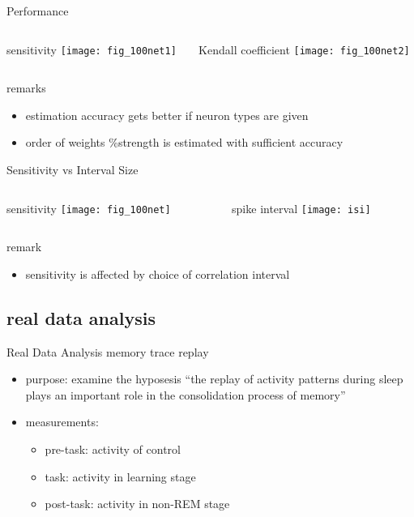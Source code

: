 \documentclass[fleqn,aspectratio=1610]{beamer}
\begin{document}
\begin{frame}[label={sec:orgc3068b3}]{Performance}
\begin{columns}
\begin{column}{0.5\columnwidth}
\centering
sensitivity
\texttt{[image: fig\_100net1]}
\end{column}
\begin{column}{0.5\columnwidth}
\centering
Kendall coefficient
\texttt{[image: fig\_100net2]}
\end{column}
\end{columns}
\begin{alertblock}{remarks}
\begin{itemize}
\item estimation accuracy gets better if neuron types are given
\item order of weights \%strength
is estimated with sufficient accuracy
\end{itemize}
\end{alertblock}
\end{frame}

\begin{frame}[label={sec:org3813442}]{Sensitivity vs Interval Size}
\begin{columns}
\begin{column}{0.5\columnwidth}
\centering
sensitivity
\texttt{[image: fig\_100net]}
\end{column}
\begin{column}{0.5\columnwidth}
\centering
spike interval
\texttt{[image: isi]}
\end{column}
\end{columns}
\begin{alertblock}{remark}
\begin{itemize}
\item sensitivity is affected by choice of
correlation interval
\end{itemize}
\end{alertblock}
\end{frame}
\subsection{real data analysis}
\label{sec:orgfea8025}
\begin{frame}[label={sec:orgb921edc}]{Real Data Analysis}
memory trace replay
\parencites{WilsonMcNaughton1994,TatsunoLipaMcNaughton2006}

\begin{itemize}
\item purpose: 
examine the hyposesis ``the replay of activity patterns during sleep 
plays an important role in the consolidation process of memory''
\item measurements:
\begin{itemize}
\item pre-task: activity of control
\item task: activity in learning stage
\item post-task: activity in non-REM stage
\end{itemize}
\end{itemize}
\end{frame}
\end{document}
